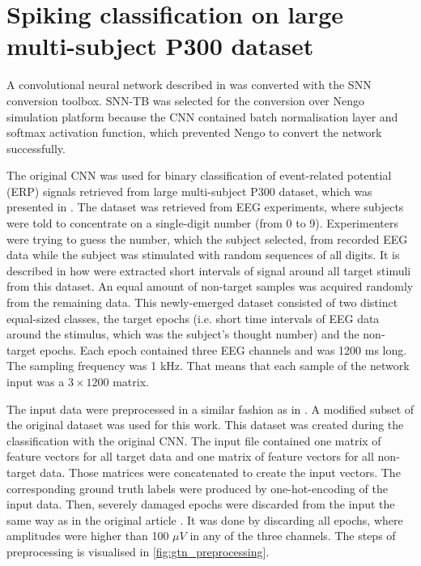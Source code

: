 \chapter{Spiking classification on large multi-subject P300 dataset} \label{chap:06}

A convolutional neural network described in \cite{varekaEvaluationConvolutional20} was converted with the SNN conversion toolbox. SNN-TB was selected for the conversion over Nengo simulation platform because the CNN contained batch normalisation layer and softmax activation function, which prevented Nengo to convert the network successfully. \par
The original CNN was used for binary classification of event-related potential (ERP) signals retrieved from large multi-subject P300 dataset, which was presented in \cite{moucekEventrelatedPotential17}. The dataset was retrieved from EEG experiments, where subjects were told to concentrate on a single-digit number (from 0 to 9). Experimenters were trying to guess the number, which the subject selected, from recorded EEG data while the subject was stimulated with random sequences of all digits. It is described in \cite{varekaEvaluationConvolutional20} how were extracted short intervals of signal around all target stimuli from this dataset. An equal amount of non-target samples was acquired randomly from the remaining data. This newly-emerged dataset consisted of two distinct equal-sized classes, the target epochs (i.e. short time intervals of EEG data around the stimulus, which was the subject's thought number) and the non-target epochs. Each epoch contained three EEG channels and was 1200 ms long. The sampling frequency was 1 kHz. That means that each sample of the network input was a $3 \times 1200$ matrix. \par
The input data were preprocessed in a similar fashion as in \cite{varekaEvaluationConvolutional20}. A modified subset \cite{moucekReplicationData19} of the original dataset was used for this work. This dataset was created during the classification with the original CNN. The input file contained one matrix of feature vectors for all target data and one matrix of feature vectors for all non-target data. Those matrices were concatenated to create the input vectors. The corresponding ground truth labels were produced by one-hot-encoding of the input data. Then, severely damaged epochs were discarded from the input the same way as in the original article \cite{varekaEvaluationConvolutional20}. It was done by discarding all epochs, where amplitudes were higher than 100 $\mu V$ in any of the three channels. The steps of preprocessing is visualised in \cref{fig:gtn_preprocessing}.

